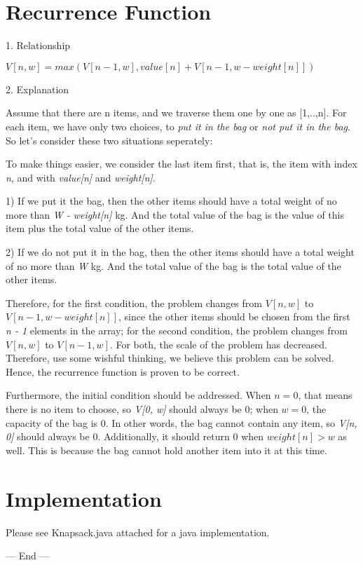 \documentclass[12pt]{article} %
\begin{document}
\section{Recurrence Function}
1. Relationship\par
\begin{center}
$V[n, w] = max(V[n - 1, w], value[n] + V[n - 1, w - weight[n]])$\par
\end{center}\par
2. Explanation\par
Assume that there are n items, and we traverse them one by one as [1,..,n]. For each item, we have only two choices, to \emph{put it in the bag} or \emph{not put it in the bag}. So let's consider these two situations seperately:\par
To make things easier, we consider the last item first, that is, the item with index \emph{n}, and with \emph{value[n]} and \emph{weight[n]}.\par
1) If we put it the bag, then the other items should have a total weight of no more than \emph{W - weight[n]} kg. And the total value of the bag is the value of this item plus the total value of the other items.\par
2) If we do not put it in the bag, then the other items should have a total weight of no more than \emph{W} kg. And the total value of the bag is the total value of the other items.\par
Therefore, for the first condition, the problem changes from $V[n, w]$ to $V[n - 1, w - weight[n]]$, since the other items should be chosen from the first \emph{n - 1} elements in the array; for the second condition, the problem changes from $V[n, w]$ to $V[n - 1, w]$. For both, the scale of the problem has decreased. Therefore, use some wishful thinking, we believe this problem can be solved. Hence, the recurrence function is proven to be correct.\par
Furthermore, the initial condition should be addressed. When $n = 0$, that means there is no item to choose, so \emph{V[0, w]} should always be 0; when $w = 0$, the capacity of the bag is 0. In other words, the bag cannot contain any item, so \emph{V[n, 0]} should always be 0. Additionally, it should return 0 when $weight[n] > w$ as well. This is because the bag cannot hold another item into it at this time.

\section{Implementation}
Please see Knapsack.java attached for a java implementation.


\begin{center}
--- End ---
\end{center}\par

\end{document}
